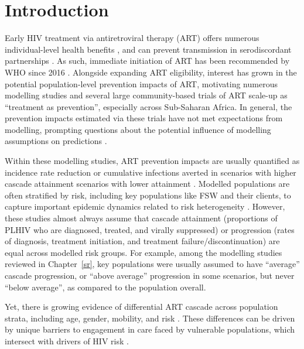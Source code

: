 \section{Introduction}\label{art.intro}
Early HIV treatment via antiretroviral therapy (ART) offers
numerous individual-level health benefits \cite{Gabillard2013,Maartens2014,Danel2015,Lundgren2015},
and can prevent transmission in serodiscordant partnerships \cite{Anglemyer2013,Cohen2016,Rodger2019}.
As such, immediate initiation of ART has been recommended by WHO since 2016 \cite{WHO2016art}.
Alongside expanding ART eligibility,
interest has grown in the potential population-level prevention impacts of ART, motivating
numerous modelling studies \cite{Granich2009,Eaton2012,Eaton2014art,Knight2022sr} and
several large community-based trials \cite{Makhema2019,Havlir2019,Hayes2019,Iwuji2018}
of ART scale-up as ``treatment as prevention'', especially across Sub-Saharan Africa.
In general, the prevention impacts estimated via these trials
have not met expectations from modelling, prompting questions about
the potential influence of modelling assumptions on predictions \cite{Baral2019}.
\par
Within these modelling studies, ART prevention impacts are usually quantified as
incidence rate reduction or cumulative infections averted
in scenarios with higher cascade attainment \vs scenarios with lower attainment \cite{Knight2022sr}.
Modelled populations are often stratified by risk,
including key populations like FSW and their clients,
to capture important epidemic dynamics related to risk heterogeneity
\cite{Stigum1994,Garnett1996,Watts2010}.
However, these studies almost always assume that cascade
attainment (\ie proportions of PLHIV who are diagnosed, treated, and virally suppressed) or
progression (\ie rates of diagnosis, treatment initiation, and treatment failure/discontinuation)
are equal across modelled risk groups.
For example, among the modelling studies reviewed in Chapter~\ref{sr},
key populations were usually assumed to have ``average'' cascade progression,
or ``above average'' progression in some scenarios, but never ``below average'',
as compared to the population overall.
\par
Yet, there is growing evidence of differential ART cascade across population strata,
including age, gender, mobility, and risk \cite{Hakim2018,Green2020}.
These differences can be driven by
unique barriers to engagement in care faced by vulnerable populations,
which intersect with drivers of HIV risk \cite{Wanyenze2016,Schwartz2017,Schmidt-Sane2022}.
